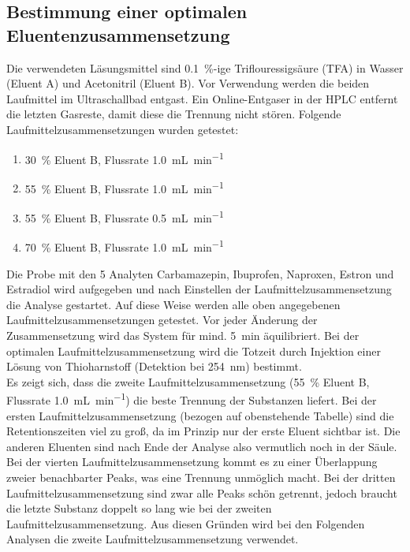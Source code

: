     
  \subsection{Bestimmung einer optimalen Eluentenzusammensetzung}
  
    Die verwendeten Läsungsmittel sind \SI[mode=text]{0.1}{\percent}-ige Triflouressigsäure (TFA) in Wasser (Eluent A) und Acetonitril (Eluent B). Vor Verwendung werden die beiden Laufmittel im Ultraschallbad entgast. Ein Online-Entgaser in der HPLC entfernt die letzten Gasreste, damit diese die Trennung nicht stören. Folgende Laufmittelzusammensetzungen wurden getestet:
    
      \begin{enumerate}
        \item \SI[mode=text]{30}{\percent} Eluent B, Flussrate \SI[mode=text]{1.0}{\milli\liter\per\minute}
        \item \SI[mode=text]{55}{\percent} Eluent B, Flussrate \SI[mode=text]{1.0}{\milli\liter\per\minute}
        \item \SI[mode=text]{55}{\percent} Eluent B, Flussrate \SI[mode=text]{0.5}{\milli\liter\per\minute}
        \item \SI[mode=text]{70}{\percent} Eluent B, Flussrate \SI[mode=text]{1.0}{\milli\liter\per\minute}
      \end{enumerate}
    Die Probe mit den 5 Analyten Carbamazepin, Ibuprofen, Naproxen, Estron und Estradiol wird aufgegeben und nach Einstellen der Laufmittelzusammensetzung die Analyse gestartet. Auf diese Weise werden alle oben angegebenen Laufmittelzusammensetzungen getestet. Vor jeder Änderung der Zusammensetzung wird das System für mind. \SI[mode=text]{5}{min} äquilibriert. Bei der optimalen Laufmittelzusammensetzung wird die Totzeit durch Injektion einer Lösung von Thioharnstoff (Detektion bei \SI[mode=text]{254}{\nano\meter}) bestimmt. \\
    
    Es zeigt sich, dass die zweite Laufmittelzusammensetzung (\SI[mode=text]{55}{\percent} Eluent B, Flussrate \SI[mode=text]{1.0}{\milli\liter\per\minute}) die beste Trennung der Substanzen liefert. Bei der ersten Laufmittelzusammensetzung (bezogen auf obenstehende Tabelle) sind die Retentionszeiten viel zu groß, da im Prinzip nur der erste Eluent sichtbar ist. Die anderen Eluenten sind nach Ende der Analyse also vermutlich noch in der Säule. Bei der vierten Laufmittelzusammensetzung kommt es zu einer Überlappung zweier benachbarter Peaks, was eine Trennung unmöglich macht. Bei der dritten Laufmittelzusammensetzung sind zwar alle Peaks schön getrennt, jedoch braucht die letzte Substanz doppelt so lang wie bei der zweiten Laufmittelzusammensetzung. Aus diesen Gründen wird bei den Folgenden Analysen die zweite Laufmittelzusammensetzung verwendet.
    
